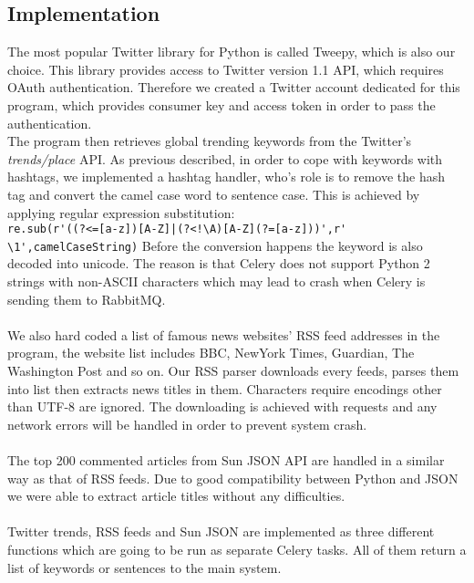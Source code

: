 \subsection{Implementation}
The most popular Twitter library for Python is called Tweepy, which is also 
our choice. This library provides access to Twitter version 1.1 API, which 
requires OAuth authentication. Therefore we created a Twitter account 
dedicated for this program, which provides consumer key and access token in 
order to pass the authentication. \\
The program then retrieves global trending keywords from the Twitter's {\em 
trends/place} API. As previous described, in order to cope with keywords with 
hashtags, we implemented a hashtag handler, who's role is to remove the hash 
tag and convert the camel case word to sentence case. This is achieved by 
applying regular expression substitution: \\
\newline
\verb`re.sub(r'((?<=[a-z])[A-Z]|(?<!\A)[A-Z](?=[a-z]))',r' \1',camelCaseString)`
\newline
Before the conversion happens the keyword is also decoded into unicode. The 
reason is that Celery does not support Python 2 strings with non-ASCII characters
which may lead to 
crash when Celery is sending them to RabbitMQ. 
\paragraph{}
We also hard coded a list of famous news websites' RSS feed addresses in the 
program, the website list includes BBC, NewYork Times, Guardian, The Washington 
Post and so on. Our RSS parser downloads every feeds, parses them into list 
then extracts news titles in them. Characters require encodings other than 
UTF-8 are ignored. The downloading is achieved with requests and any network 
errors will be handled in order to prevent system crash. 
\paragraph{}
The top 200 commented articles from Sun JSON API are handled in a similar way 
as that of RSS feeds. Due to good compatibility between Python and JSON we 
were able to extract article titles without any difficulties. 
\paragraph{}
Twitter trends, RSS feeds and Sun JSON are implemented as three different 
functions which are going to be run as separate Celery tasks. All of them 
return a list of keywords or sentences to the main system. 
